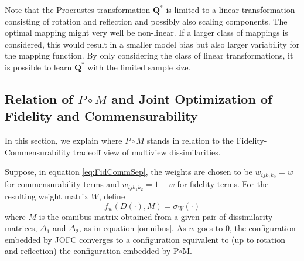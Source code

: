 \documentclass[12pt,oneside,final]{thesis}\usepackage[]{graphicx}\usepackage[]{color}
\begin{document}
Note that the Procrustes transformation $\mathbf{Q}^*$  is limited to  a linear transformation consisting of rotation and reflection and possibly also scaling components. The optimal mapping might  very well be   non-linear. If a larger class of mappings is considered, this would result in a smaller model bias but also larger variability for the mapping function. By only considering the class of linear transformations, it is possible to learn $\mathbf{Q}^{*}$ with the limited sample size.

\subsection{Relation of $P\circ M$ and Joint Optimization of Fidelity and Commensurability} 

In this section, we explain where $P\circ M$ stands in relation to the Fidelity-Commensurability tradeoff view of multiview dissimilarities.

Suppose, in equation \eqref{eq:FidCommSep}, the weights are chosen to be $w_{ijk_1k_2}=w$ for commensurability terms and $w_{ijk_1k_2}=1-w$ for fidelity terms. For the resulting weight matrix $W$, define 
\begin{equation}
f_w(D(\cdot),M) = \sigma_W(\cdot) \label{fid-comm-tradeoff-func}
\end{equation}
 where $M$ is the omnibus matrix obtained from  a given pair of dissimilarity matrices, $\Delta_1$ and $\Delta_2$, as in equation \eqref{omnibus}.   As $w$ goes to 0, the configuration embedded by JOFC converges to a configuration equivalent to (up to rotation and reflection)  the configuration embedded by P$\circ$M.
\end{document}
